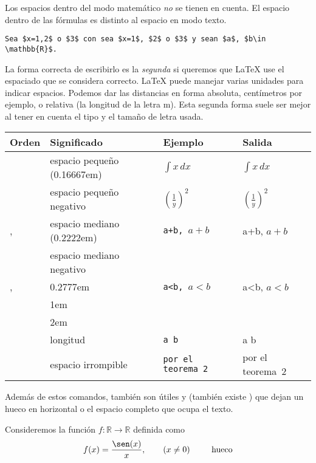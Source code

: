 \documentclass{article}
\numberwithin{equation}{section}
\theoremstyle{plain}
\theoremstyle{definition}
\theoremstyle{remark}
\begin{document}
Los espacios dentro del modo matemático \emph{no} se tienen en cuenta. El espacio dentro de las fórmulas es distinto al espacio en modo texto.

\begin{verbatim}
Sea $x=1,2$ o $3$ con sea $x=1$, $2$ o $3$ y sean $a$, $b\in \mathbb{R}$.
\end{verbatim}

La forma correcta de escribirlo es la \emph{segunda} si queremos que
\LaTeX{} use el espaciado que se considera correcto. \LaTeX{} puede manejar varias unidades para indicar espacios. Podemos dar las distancias en forma absoluta, centímetros por ejemplo, o relativa (la longitud de la letra m). Esta segunda forma suele ser mejor al tener en cuenta el tipo y el tamaño de letra usada. 

\begin{table}[H]
\centering
\begin{tabular}{@{}llll@{}}
\toprule
Orden & Significado & Ejemplo & Salida \\
\midrule
\texttt{\,} & espacio pequeño (0.16667em) & \texttt{$\int x\, dx$ } & $\int x\, dx$ \\
\texttt{\!} & espacio pequeño negativo & \texttt{$\left(\frac{1}{y}\right)^{\!2}$} & $\left(\frac{1}{y}\right)^{\!2}$ \\
\texttt{\>}, \texttt{\:} & espacio mediano (0.2222em) & \texttt{a\:+\:b, $a+b$} & a\:+\:b, $a+b$ \\
\texttt{\negmedspace} & espacio mediano negativo & & \\
\texttt{\;}, \texttt{\thickspace} & 0.2777em & \texttt{a\:<\:b, $a<b$} & a\:<\:b, $a<b$ \\
\texttt{\quad} & 1em & & \\
\texttt{\qquad} & 2em & & \\
\texttt{\hspace{longitud}} & longitud & \texttt{a \hspace{1cm} b} & a \hspace{1cm} b \\
\texttt{~} & espacio irrompible & \texttt{por el teorema~2} & por el teorema~2\\
\bottomrule
\end{tabular}
\end{table}
Además de estos comandos, también son útiles \texttt{\phantom{texto}} y \texttt{\hphantom{texto}} (también existe \texttt{\vphantom}) que dejan un hueco en horizontal o el espacio completo que ocupa el texto.
\begin{codigo-arriba}
Consideremos la función $f \colon \mathbb{R} \to \mathbb{R}$ definida
como 
\[
f(x) = \frac{\sen(x)}{x}, \qquad (x \neq 0) \hphantom{hueco} \text{hueco}
\]
\end{codigo-arriba}
\end{document}
